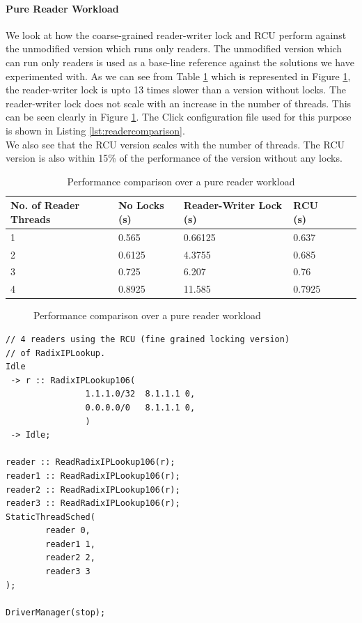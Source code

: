 \documentclass{article}
\begin{document}
\paragraph{Pure Reader Workload}
We look at how the coarse-grained reader-writer lock and RCU perform against the unmodified version which runs only readers.
The unmodified version which can run only readers is used as a base-line reference against the solutions we have experimented with.
As we can see from Table \ref{tbl:readerwriter_nolocks} which is represented in Figure \ref{chart:readers_comparison}, the reader-writer lock is upto 13 times slower than a version without locks.
The reader-writer lock does not scale with an increase in the number of threads. This can be seen clearly in Figure \ref{chart:readers_comparison}. The Click configuration file used for this purpose is shown in Listing \ref{lst:readercomparison}.
\\ We also see that the RCU version scales with the number of threads. The RCU version is also within 15\% of the performance of the version without any locks.\\

\begin{table}
\begin{center}
\begin{tabular}{|l|l|l|l|l|l|}
\hline No. of Reader Threads & No Locks (s) & Reader-Writer Lock (s) &  RCU (s)\\
\hline 1 & 0.565 & 0.66125 & 0.637\\
\hline 2 & 0.6125 & 4.3755 & 0.685\\
\hline 3 & 0.725 & 6.207 & 0.76\\
\hline 4 & 0.8925 & 11.585 & 0.7925\\
\hline
\end{tabular}
\end{center}
\label{tbl:readerwriter_nolocks}
\caption{Performance comparison over a pure reader workload}
\end{table}

\begin{figure}[tph]
\caption{Performance comparison over a pure reader workload}
\label{chart:readers_comparison}
\end{figure}

\begin{lstlisting}[float=tph, caption = A Click configuration file for 4 readers, label =lst:readercomparison]
// 4 readers using the RCU (fine grained locking version)
// of RadixIPLookup.
Idle
 -> r :: RadixIPLookup106(
                1.1.1.0/32  8.1.1.1 0,
                0.0.0.0/0   8.1.1.1 0,
                ) 
 -> Idle;

reader :: ReadRadixIPLookup106(r);
reader1 :: ReadRadixIPLookup106(r);
reader2 :: ReadRadixIPLookup106(r);
reader3 :: ReadRadixIPLookup106(r);
StaticThreadSched(
        reader 0,
        reader1 1,
        reader2 2,
        reader3 3
);

DriverManager(stop);

\end{lstlisting}
\end{document}
